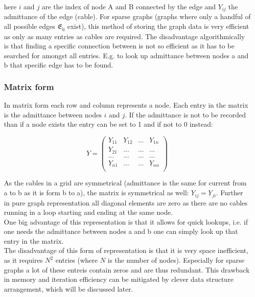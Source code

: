here $i$ and $j$ are the index of node A and B connected by the edge and
$Y_{ij}$ the admittance of the edge (cable).
For sparse graphs (graphs where only a handful of all possible edges $\mathfrak{E_{ij}}$ exist), this method
of storing the graph data is very efficient as only as many entries as cables are required. The disadvantage
algorithmically is that finding a specific connection between is not so efficient as it has to be searched for amongst
all entries. E.g. to look up admittance between nodes a and b that specific edge has to be found.

\subsubsection{Matrix form}

In matrix form each row and column represents a node. Each entry in the matrix is the admittance between nodes $i$ and $j$.
If the admittance is not to be recorded than if a node exists the entry can be set to 1 and if not to 0 instead:

\begin{equation}
    Y =
    \begin{pmatrix}
        Y_{11} & Y_{12} & ... & Y_{1n}\\
        Y_{21} & ...    & ... & ...   \\
        ...    & ...    & ... & ...   \\
        Y_{n1} & ...    & ... & Y_{nn}\\
    \end{pmatrix}
\end{equation}

As the cables in a grid are symmetrical (admittance is the same for current from a to b as it is form b to a), 
the matrix is symmetrical as well: $Y_{ij} = Y_{ji}$. Further in pure graph representation all diagonal elements are
zero as there are no cables running in a loop starting and ending at the same node.\\ 
One big advantage of this representation is that it allows for quick lookups, i.e. if one needs the admittance between nodes a and b
one can simply look up that entry in the matrix.\\
The disadvantage of this form of representation is that it is very space inefficient, as it requires
$N^2$ entries (where $N$ is the number of nodes). Especially for sparse graphs a lot of these entreis contain
zeros and are thus redundant. This drawback in memory and iteration efficiency
can be mitigated by clever data structure arrangement, which will be discussed later. 

